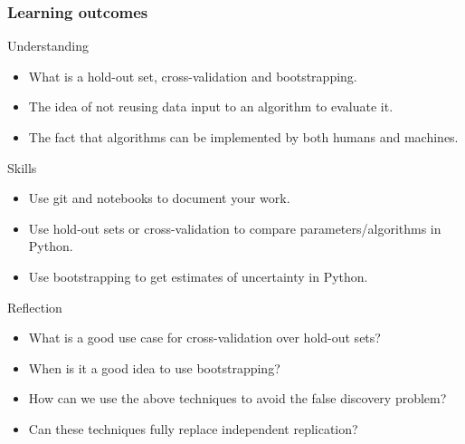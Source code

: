 \begin{frame}
  \frametitle{Learning outcomes}
  \begin{block}{Understanding}
    \begin{itemize}
    \item What is a hold-out set, cross-validation and bootstrapping.
    \item The idea of not reusing data input to an algorithm to evaluate it.
    \item The fact that algorithms can be implemented by both humans and machines.
    \end{itemize}
  \end{block}
  
  \begin{block}{Skills}
    \begin{itemize}
    \item Use git and notebooks to document your work.
    \item Use hold-out sets or cross-validation to compare parameters/algorithms in Python.
    \item Use bootstrapping to get estimates of uncertainty in Python.
    \end{itemize}
  \end{block}

  \begin{block}{Reflection}
    \begin{itemize}
    \item What is a good use case for cross-validation over hold-out sets?
    \item When is it a good idea to use bootstrapping?
    \item How can we use the above techniques to avoid the false discovery problem?
    \item Can these techniques fully replace independent replication?
    \end{itemize}
  \end{block}
  
\end{frame}



